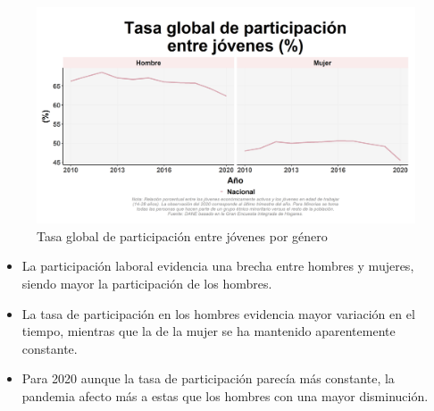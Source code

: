     \begin{figure}[H]
        \caption{Tasa global de participación entre jóvenes por género \label{map_result_2} }
        \begin{center}
        \includegraphics[width=\textwidth,keepaspectratio]{img/var_85_trend.png}
        \end{center}
    \end{figure}
            \begin{itemize}
                \item La participación laboral evidencia una brecha entre hombres y mujeres, siendo mayor la participación de los hombres.
                \item La tasa de participación en los hombres evidencia mayor variación en el tiempo, mientras que la de la mujer se ha mantenido aparentemente constante.
                \item Para 2020 aunque la tasa de participación parecía más constante, la pandemia afecto más a estas que los hombres con una mayor disminución.
                \end{itemize}

